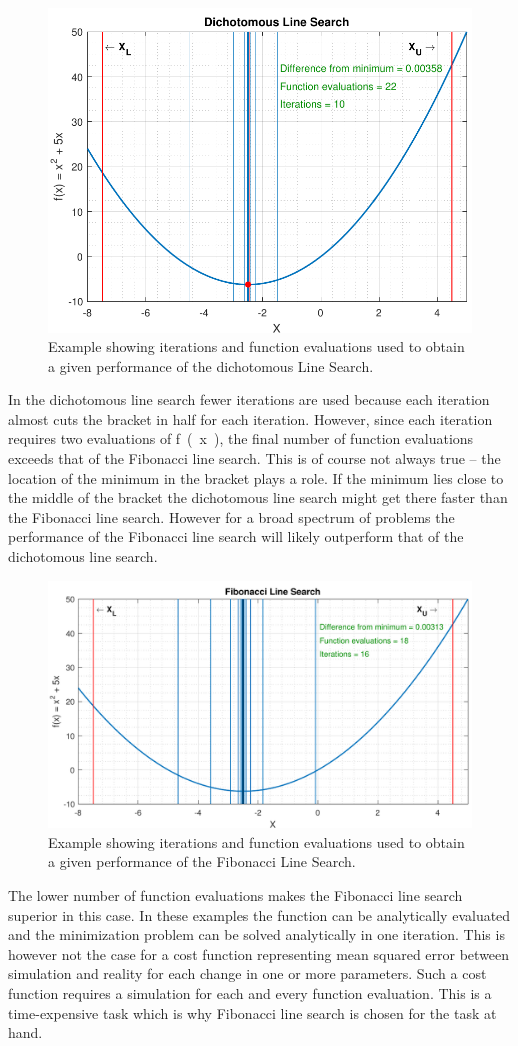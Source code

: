\begin{figure}[H] 
	\centering
	\includegraphics[width=.65\textwidth]{figures/dichotomousLineSearchPerformance}
	\caption{Example showing iterations and function evaluations used to obtain a given performance of the dichotomous Line Search.}
	\label{dichotomousLineSearchPerformance}
\end{figure}

In the dichotomous line search fewer iterations are used because each iteration almost cuts the bracket in half for each iteration. However, since each iteration requires two evaluations of \si{f(x)}, the final number of function evaluations exceeds that of the Fibonacci line search. This is of course not always true -- the location of the minimum in the bracket plays a role. If the minimum lies close to the middle of the bracket the dichotomous line search might get there faster than the Fibonacci line search. However for a broad spectrum of problems the performance of the Fibonacci line search will likely outperform that of the dichotomous line search.

\begin{figure}[H] 
	\centering
	\includegraphics[width=.65\textwidth]{figures/fibonacciLineSearchPerformance}
	\caption{Example showing iterations and function evaluations used to obtain a given performance of the Fibonacci Line Search.}
	\label{fibonacciLineSearchPerformance}
\end{figure}

The lower number of function evaluations makes the Fibonacci line search superior in this case. In these examples the function can be analytically evaluated and the minimization problem can be solved analytically in one iteration. This is however not the case for a cost function representing mean squared error between simulation and reality for each change in one or more parameters. Such a cost function requires a simulation for each and every function evaluation. This is a time-expensive task which is why Fibonacci line search is chosen for the task at hand.